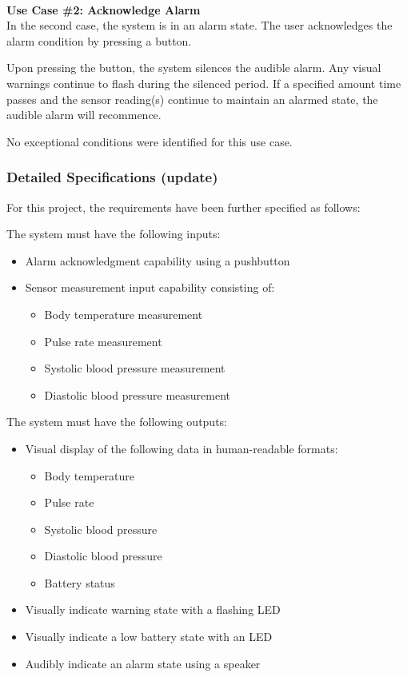 \documentclass[12pt]{article} %
\begin{document}
~\\
\textbf{Use Case \#2: Acknowledge Alarm} \\
In the second case, the system is in an alarm state. The user acknowledges
the alarm condition by pressing a button.

Upon pressing the button, the system silences the audible alarm. Any visual warnings continue to flash during the silenced period. If a specified amount 
time passes and the sensor reading(s) continue to maintain an alarmed state,
the audible alarm will recommence.

No exceptional conditions were identified for this use case.\\


\subsubsection{Detailed Specifications (update)}
For this project, the requirements have been further specified as follows:

\begin{itemize}[$$]
  \item The system must have the following inputs:
    \begin{itemize}[$\bullet$]
      \item Alarm acknowledgment capability using a pushbutton
      \item Sensor measurement input capability consisting of:
	\begin{itemize}
	\item Body temperature measurement
	\item Pulse rate measurement
	\item Systolic blood pressure measurement
	\item Diastolic blood pressure measurement
	\end{itemize}
    \end{itemize}
\end{itemize}


\begin{itemize}[$$]
 \item The system must have the following outputs:
    \begin{itemize}[$\bullet$]
      \item Visual display of the following data in human-readable formats:
	\begin{itemize}
	\item Body temperature
	\item Pulse rate
	\item Systolic blood pressure
	\item Diastolic blood pressure
	\item Battery status
	\end{itemize}
      \item Visually indicate warning state with a flashing LED
      \item Visually indicate a low battery state with an LED
      \item Audibly indicate an alarm state using a speaker
    \end{itemize}
\end{itemize}
\end{document}
